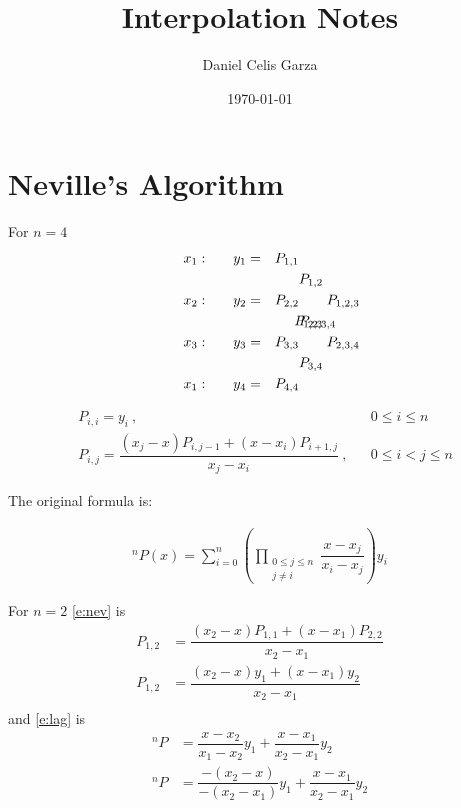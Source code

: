 \documentclass[10pt,a4paper]{article}
\author{Daniel Celis Garza}
\title{Interpolation Notes}
\date{\today}
\begin{document}
\maketitle
\section{Neville's Algorithm}
For $n = 4$
\begin{align*}
x_{1}:\qquad& y_{1} =& P_{1,1} 	&					\hspace{-2cm}&				   \\
			&		 & 	& P_{1,2}			\hspace{-2cm}&				   \\
x_{2}:\qquad& y_{2} =& P_{2,2} 	&\qquad P_{1,2,3}	\hspace{-2cm}&				   \\
			&		 &		 	& P_{2,3}			\hspace{-2cm}& P_{1,2,3,4}	   \\
x_{3}:\qquad& y_{3}	=& P_{3,3}	&\qquad P_{2,3,4}	\hspace{-2cm}&				   \\
			&		 & 	& P_{3,4}			\hspace{-2cm}&				   \\
x_{1}:\qquad& y_{4} =& P_{4,4} 	&					\hspace{-2cm}&				   \\
\end{align*}

\begin{subequations}\label{e:nev}
\begin{align}
& P_{i,i} = y_{i}~, && 0\le i \le n \\
& P_{i,j} =
\dfrac{
(x_j-x)P_{i,j-1} + (x-x_i)P_{i+1,j}
}
{
x_{j}-x_{i}
}~, && 0\le i < j \le n
\end{align}
\end{subequations}

The original formula is:

\begin{align}\label{e:lag}
^{n}P(x) = \sum\limits_{i=0}^{n}\left(
\prod\limits_{\substack{0 \le j \le n \\ j \ne i}}
\dfrac{x-x_{j}}{x_{i}-x_{j}}
\right)y_{i}
\end{align}

For $n = 2$ \cref{e:nev} is
\begin{align*}
P_{1,2} &= \dfrac{(x_{2} - x)P_{1,1} + (x-x_{1})P_{2,2}}{x_{2}-x_{1}}\\
P_{1,2} &= \dfrac{(x_{2} - x)y_{1} + (x-x_{1})y_{2}}{x_{2}-x_{1}}	 \\
\end{align*}
and \cref{e:lag} is
\begin{align*}
^{n}P &= \dfrac{x-x_{2}}{x_{1}-x_{2}}y_{1} + \dfrac{x-x_{1}}{x_{2}-x_{1}}y_{2} \\
^{n}P &= \dfrac{-(x_{2}-x)}{-(x_{2}-x_{1})}y_{1} + \dfrac{x-x_{1}}{x_{2}-x_{1}}y_{2} \\
\end{align*}
\end{document}
